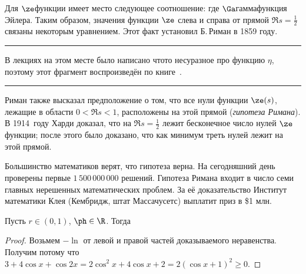 \documentclass[a4paper]{article}
\newenvironment{petit}
{\par\smallskip\hrule\smallskip\footnotesize}{\par\smallskip\hrule\smallskip}
\begin{document}
Для $\ze$\д функции имеет место следующее соотношение:
где $\Ga$\т гамма\д функция  Эйлера.
Таким образом, значения функции $\ze$ слева и справа от прямой $\Re s = \frac12$ связаны некоторым уравнением.
Этот факт установил Б.\,Риман в 1859 году.

\begin{petit}
В лекциях на этом месте было написано что\д то несуразное про функцию $\eta$,
поэтому этот фрагмент воспроизведён по книге~\cite{gnsh}.
\end{petit}

Риман также высказал предположение о том, что все нули функции $\ze(s)$, лежащие в области $0<\Re s<1$,
расположены на этой прямой (\emph{гипотеза Римана}).
В 1914~году Харди доказал, что на $\Re s=\frac12$ лежит бесконечное число нулей $\ze$\д функции; после
этого было доказано, что как минимум треть нулей лежит на этой прямой.

Большинство математиков верят, что гипотеза верна. На сегодняшний день проверены первые $1\,500\,000\,000$
решений. Гипотеза Римана входит в число семи главных нерешенных математических проблем. За её доказательство
Институт математики Клея (Кембридж, штат Массачусетс) выплатит приз в \$1 млн.

\begin{lemma}\label{lem:prodBound}
Пусть $r\in(0,1)$, $\ph\in\R$. Тогда
\end{lemma}

\begin{proof}
Возьмем $-\ln$ от левой и правой частей доказываемого неравенства. Получим
потому что $3+4\cos x+\cos 2x=2\cos^2x+4\cos x+2=2(\cos x+1)^2\ge0$.
\end{proof}
\end{document}
